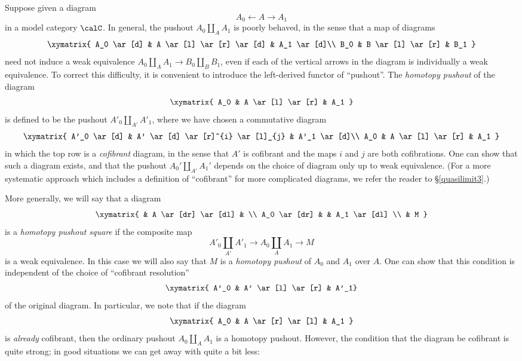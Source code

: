 \begin{Model Categories}
\begin{Already Read}
Suppose given a diagram
$$ A_0 \leftarrow A \rightarrow A_1$$ in a model category $\calC$. In general, the pushout
$ A_0 \coprod_A A_1$ is poorly behaved, in the sense that a map of diagrams
$$ \xymatrix{ A_0 \ar[d] & A \ar[l] \ar[r] \ar[d] & A_1 \ar[d]\\
B_0 & B \ar[l] \ar[r] & B_1 }$$
need not induce a weak equivalence $A_0 \coprod_A A_1 \rightarrow B_0 \coprod_B B_1$, even if
each of the vertical arrows in the diagram is individually a weak equivalence. To correct this difficulty, it is convenient to introduce the left-derived functor of ``pushout''. The {\it homotopy pushout} of the diagram
$$ \xymatrix{ A_0 & A \ar[l] \ar[r] & A_1 } $$
is defined to be the pushout $A'_0 \coprod_{ A' } A'_1$, where we have chosen a commutative diagram
$$ \xymatrix{ A'_0 \ar[d] & A' \ar[d] \ar[r]^{i} \ar[l]_{j} & A'_1 \ar[d]\\
A_0 & A \ar[l] \ar[r] & A_1 } $$
in which the top row is a {\em cofibrant} diagram, in the sense that $A'$ is cofibrant and the maps
$i$ and $j$ are both cofibrations. One can show that such a diagram exists, and that the pushout $A_0' \coprod_{A'} A_1'$ depends on the choice of diagram only up to weak equivalence. (For a more systematic approach which includes a definition of ``cofibrant'' for more complicated diagrams, we refer the reader to \S \ref{quasilimit3}.) 

More generally, we will say that a diagram
$$ \xymatrix{ & A \ar[dr] \ar[dl] & \\
A_0 \ar[dr] & & A_1 \ar[dl] \\
& M }$$
is a {\it homotopy pushout square} if the composite map
$$ A'_0 \coprod_{A'} A'_1 \rightarrow A_0 \coprod_{A} A_1 \rightarrow M$$
is a weak equivalence. In this case we will also say that $M$ is a {\it homotopy pushout} of
$A_0$ and $A_1$ over $A$. One can show that this condition is independent of the choice of
``cofibrant resolution'' $$ \xymatrix{ A'_0 & A' \ar[l] \ar[r] & A'_1}$$ of the original diagram.
In particular, we note that if the diagram
$$ \xymatrix{ A_0 & A \ar[r] \ar[l] & A_1 }$$
is {\em already} cofibrant, then the ordinary pushout $A_0 \coprod_A A_1$ is a homotopy pushout. However, the condition that the diagram be cofibrant is quite strong; in good situations we can get away with quite a bit less:


\end{Already Read}
\end{Model Categories}
